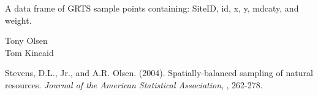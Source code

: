 \begin{Value}
A data frame of GRTS sample points containing: SiteID, id, x, y, mdcaty,
and weight.
\end{Value}
\begin{Author}\relax
Tony Olsen \\
Tom Kincaid 
\end{Author}
\begin{References}\relax
Stevens, D.L., Jr., and A.R. Olsen. (2004). Spatially-balanced sampling of
natural resources. \emph{Journal of the American Statistical Association}, ,
262-278.
\end{References}
\begin{SeeAlso}\relax
{}
\end{SeeAlso}

